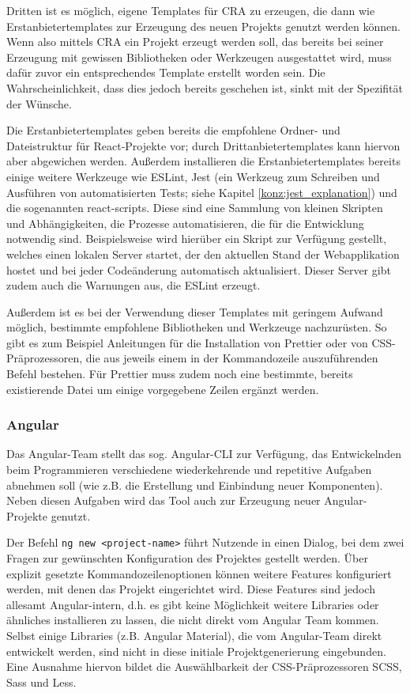 Dritten ist es möglich, eigene Templates für \gls{CRA} zu erzeugen, die dann wie Erstanbietertemplates zur Erzeugung des neuen Projekts genutzt werden können. Wenn also mittels \gls{CRA} ein Projekt erzeugt werden soll, das bereits bei seiner Erzeugung mit gewissen Bibliotheken oder Werkzeugen ausgestattet wird, muss dafür zuvor ein entsprechendes Template erstellt worden sein. Die Wahrscheinlichkeit, dass dies jedoch bereits geschehen ist, sinkt mit der Spezifität der Wünsche.

Die Erstanbietertemplates geben bereits die empfohlene Ordner- und Dateistruktur für React-Projekte vor; durch Drittanbietertemplates kann hiervon aber abgewichen werden. Außerdem installieren die Erstanbietertemplates bereits einige weitere Werkzeuge wie ESLint, Jest (ein Werkzeug zum Schreiben und Ausführen von automatisierten Tests; siehe Kapitel \ref{konz:jest_explanation}) und die sogenannten react-scripts. Diese sind eine Sammlung von kleinen Skripten und Abhängigkeiten, die Prozesse automatisieren, die für die Entwicklung notwendig sind. Beispielsweise wird hierüber ein Skript zur Verfügung gestellt, welches einen lokalen Server startet, der den aktuellen Stand der Webapplikation hostet und bei jeder Codeänderung automatisch aktualisiert. Dieser Server gibt zudem auch die Warnungen aus, die ESLint erzeugt.

Außerdem ist es bei der Verwendung dieser Templates mit geringem Aufwand möglich, bestimmte empfohlene Bibliotheken und Werkzeuge nachzurüsten. So gibt es zum Beispiel Anleitungen für die Installation von Prettier oder von CSS-Präprozessoren, die aus jeweils einem in der Kommandozeile auszuführenden Befehl bestehen. Für Prettier muss zudem noch eine bestimmte, bereits existierende Datei um einige vorgegebene Zeilen ergänzt werden.

\subsubsection{Angular}
Das Angular-Team stellt das sog. Angular-\gls{CLI} zur Verfügung, das Entwickelnden beim Programmieren verschiedene wiederkehrende und repetitive Aufgaben abnehmen soll (wie z.B. die Erstellung und Einbindung neuer Komponenten). Neben diesen Aufgaben wird das Tool auch zur Erzeugung neuer Angular-Projekte genutzt.

Der Befehl \verb|ng new <project-name>| führt Nutzende in einen Dialog, bei dem zwei Fragen zur gewünschten Konfiguration des Projektes gestellt werden. Über explizit gesetzte Kommandozeilenoptionen können weitere Features konfiguriert werden, mit denen das Projekt eingerichtet wird. Diese Features sind jedoch allesamt Angular-intern, d.h. es gibt keine Möglichkeit weitere Libraries oder ähnliches installieren zu lassen, die nicht direkt vom Angular Team kommen. Selbst einige Libraries (z.B. Angular Material), die vom Angular-Team direkt entwickelt werden, sind nicht in diese initiale Projektgenerierung eingebunden. Eine Ausnahme hiervon bildet die Auswählbarkeit der CSS-Präprozessoren SCSS, Sass und Less.

